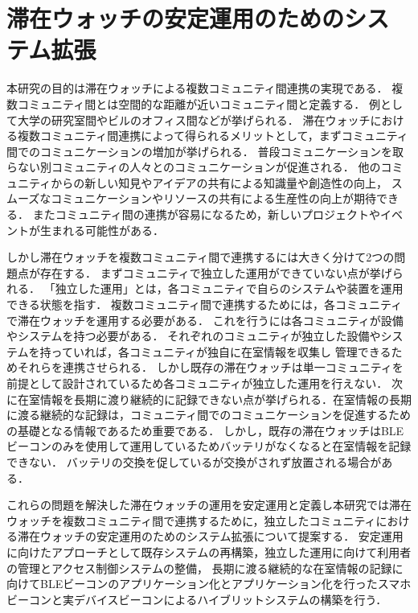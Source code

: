 \section{滞在ウォッチの安定運用のためのシステム拡張}\label{1.2}

本研究の目的は滞在ウォッチによる複数コミュニティ間連携の実現である．
複数コミュニティ間とは空間的な距離が近いコミュニティ間と定義する．
例として大学の研究室間やビルのオフィス間などが挙げられる．
滞在ウォッチにおける複数コミュニティ間連携によって得られるメリットとして，まずコミュニティ間でのコミュニケーションの増加が挙げられる．
普段コミュニケーションを取らない別コミュニティの人々とのコミュニケーションが促進される．
他のコミュニティからの新しい知見やアイデアの共有による知識量や創造性の向上，
スムーズなコミュニケーションやリソースの共有による生産性の向上が期待できる．
またコミュニティ間の連携が容易になるため，新しいプロジェクトやイベントが生まれる可能性がある．

しかし滞在ウォッチを複数コミュニティ間で連携するには大きく分けて2つの問題点が存在する．
まずコミュニティで独立した運用ができていない点が挙げられる．
「独立した運用」とは，各コミュニティで自らのシステムや装置を運用できる状態を指す．
複数コミュニティ間で連携するためには，各コミュニティで滞在ウォッチを運用する必要がある．
これを行うには各コミュニティが設備やシステムを持つ必要がある．
それぞれのコミュニティが独立した設備やシステムを持っていれば，各コミュニティが独自に在室情報を収集し
管理できるためそれらを連携させられる．
しかし既存の滞在ウォッチは単一コミュニティを前提として設計されているため各コミュニティが独立した運用を行えない．
次に在室情報を長期に渡り継続的に記録できない点が挙げられる．在室情報の長期に渡る継続的な記録は，コミュニティ間でのコミュニケーションを促進するための基礎となる情報であるため重要である．
しかし，既存の滞在ウォッチはBLEビーコンのみを使用して運用しているためバッテリがなくなると在室情報を記録できない．
バッテリの交換を促しているが交換がされず放置される場合がある．

これらの問題を解決した滞在ウォッチの運用を安定運用と定義し本研究では滞在ウォッチを複数コミュニティ間で連携するために，独立したコミュニティにおける滞在ウォッチの安定運用のためのシステム拡張について提案する．
安定運用に向けたアプローチとして既存システムの再構築，独立した運用に向けて利用者の管理とアクセス制御システムの整備，
長期に渡る継続的な在室情報の記録に向けてBLEビーコンのアプリケーション化とアプリケーション化を行ったスマホビーコンと実デバイスビーコンによるハイブリットシステムの構築を行う．





